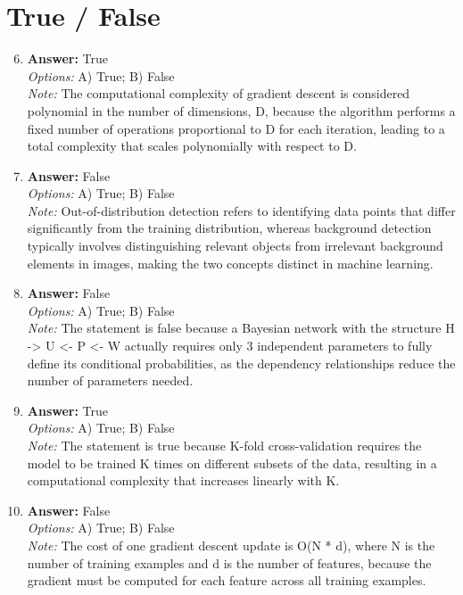 \documentclass[12pt]{article}
\begin{document}
\section*{True / False}
\begin{enumerate}[label=\arabic*.]
\setcounter{enumi}{5}
\item \textbf{Answer:} True
\\ \textit{Options:} A) True; B) False
\\ \textit{Note:} The computational complexity of gradient descent is considered polynomial in the number of dimensions, D, because the algorithm performs a fixed number of operations proportional to D for each iteration, leading to a total complexity that scales polynomially with respect to D.
\item \textbf{Answer:} False
\\ \textit{Options:} A) True; B) False
\\ \textit{Note:} Out-of-distribution detection refers to identifying data points that differ significantly from the training distribution, whereas background detection typically involves distinguishing relevant objects from irrelevant background elements in images, making the two concepts distinct in machine learning.
\item \textbf{Answer:} False
\\ \textit{Options:} A) True; B) False
\\ \textit{Note:} The statement is false because a Bayesian network with the structure H -\textgreater{} U \textless{}- P \textless{}- W actually requires only 3 independent parameters to fully define its conditional probabilities, as the dependency relationships reduce the number of parameters needed.
\item \textbf{Answer:} True
\\ \textit{Options:} A) True; B) False
\\ \textit{Note:} The statement is true because K-fold cross-validation requires the model to be trained K times on different subsets of the data, resulting in a computational complexity that increases linearly with K.
\item \textbf{Answer:} False
\\ \textit{Options:} A) True; B) False
\\ \textit{Note:} The cost of one gradient descent update is O(N * d), where N is the number of training examples and d is the number of features, because the gradient must be computed for each feature across all training examples.
\end{enumerate}
\end{document}
